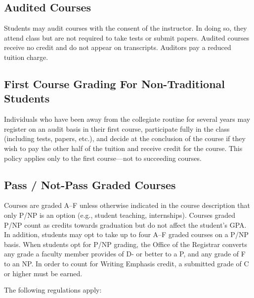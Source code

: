 \documentclass[
  letterpaper,
]{scrbook}
\begin{document}
\hypertarget{audited-courses}{%
\subsection{Audited Courses}\label{audited-courses}}

Students may audit courses with the consent of the instructor. In doing
so, they attend class but are not required to take tests or submit
papers. Audited courses receive no credit and do not appear on
transcripts. Auditors pay a reduced tuition charge.

\hypertarget{first-course-grading-for-non-traditional-students}{%
\subsection{First Course Grading For Non-Traditional
Students}\label{first-course-grading-for-non-traditional-students}}

Individuals who have been away from the collegiate routine for several
years may register on an audit basis in their first course, participate
fully in the class (including tests, papers, etc.), and decide at the
conclusion of the course if they wish to pay the other half of the
tuition and receive credit for the course. This policy applies only to
the first course---not to succeeding courses.

\hypertarget{pass-not-pass-graded-courses}{%
\subsection{Pass / Not-Pass Graded
Courses}\label{pass-not-pass-graded-courses}}

Courses are graded A--F unless otherwise indicated in the course
description that only P/NP is an option (e.g., student teaching,
internships). Courses graded P/NP count as credits towards graduation
but do not affect the student's GPA. In addition, students may opt to
take up to four A--F graded courses on a P/NP basis. When students opt
for P/NP grading, the Office of the Registrar converts any grade a
faculty member provides of D- or better to a P, and any grade of F to an
NP. In order to count for Writing Emphasis credit, a submitted grade of
C or higher must be earned.

The following regulations apply:
\end{document}
